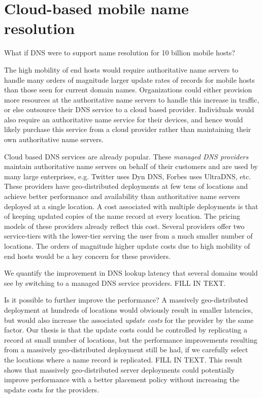 
\section{Cloud-based mobile name resolution}



What if DNS were to support name resolution for 10 billion mobile hosts? 

The high mobility of end hosts would require authoritative name servers to handle many orders of magnitude larger update rates of records for mobile hosts than those seen for current domain names. Organizations could either provision more resources at the authoritative name servers to handle this increase in traffic, or else outsource their DNS service to a cloud based provider. Individuals would also require an authoritative name service for their devices, and hence would likely purchase this service from a cloud provider rather than maintaining their own authoritative name servers.

Cloud based DNS services are already popular. These \emph{managed DNS providers} maintain authoritative name servers on behalf of their customers and are used by many large enterprises, e.g. Twitter uses Dyn DNS, Forbes uses UltraDNS, etc. These providers have  geo-distributed deployments at few tens of locations and achieve better performance and availability than authoritative name servers deployed at a single location. A cost associated with multiple deployments is that of keeping updated copies of the name record at every location. The pricing models of these providers already reflect this cost. Several providers offer two service-tiers with the lower-tier serving  the user from  a much smaller number of locations. The orders of magnitude higher update costs due to high mobility of end hosts would be a key concern for these providers.

We quantify the improvement in DNS lookup latency that several domains would see by switching to a managed DNS service providers. FILL IN TEXT.


Is it possible to further improve the performance? A massively geo-distributed deployment at hundreds of locations would obviously result in smaller latencies, but would also increase the associated \emph{update costs} for the provider by the same factor. Our thesis is that the update costs could be controlled by replicating a record at small number of locations, but the performance improvements resulting from a massively geo-distributed deployment still be had, if we carefully select the locations where a name record is replicated. FILL IN TEXT. This result shows that massively geo-distributed server deployments could potentially improve  performance with a better placement policy without increasing the update costs for the providers.


